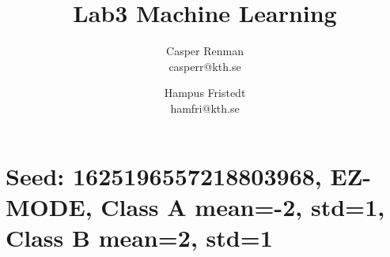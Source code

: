 \documentclass{article}
\title{Lab3 Machine Learning}
\author{Casper Renman\\casperr@kth.se \and Hampus Fristedt\\hamfri@kth.se}
\begin{document}
\maketitle

\section{Seed: 1625196557218803968, EZ-MODE, Class A mean=-2, std=1, Class B mean=2, std=1}

\end{document}
